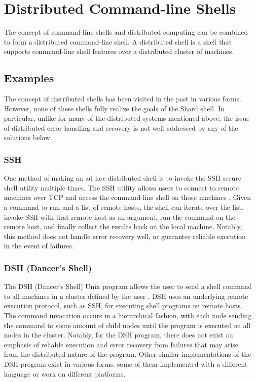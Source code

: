 \documentclass[twoside]{report}
\begin{document}
\section{Distributed Command-line Shells}
The concept of command-line shells and distributed computing can be combined to form a distributed command-line shell.
A distributed shell is a shell that supports command-line shell features over a distributed cluster of machines.

\subsection{Examples}
The concept of distributed shells has been visited in the past in various forms.
However, none of these shells fully realize the goals of the Shard shell.
In particular, unlike for many of the distributed systems mentioned above, the issue of distributed error handling and recovery is not well addressed by any of the solutions below.

\subsubsection{SSH}
One method of making an ad hoc distributed shell is to invoke the SSH secure shell utility multiple times.
The SSH utility allows users to connect to remote machines over TCP and access the command-line shell on those machines \cite{rfc4251}.
Given a command to run and a list of remote hosts, the shell can iterate over the list, invoke SSH with that remote host as an argument, run the command on the remote host, and finally collect the results back on the local machine.
Notably, this method does not handle error recovery well, or guarantee reliable execution in the event of failures.

\subsubsection{DSH (Dancer's Shell)}
The DSH (Dancer's Shell) Unix program allows the user to send a shell command to all machines in a cluster defined by the user \cite{dshdancer}.
DSH uses an underlying remote execution protocol, such as SSH, for executing shell programs on remote hosts.
The command invocation occurs in a hierarchical fashion, with each node sending the command to some amount of child nodes until the program is executed on all nodes in the cluster.
Notably, for the DSH program, there does not exist an emphasis of reliable execution and error recovery from failures that may arise from the distributed nature of the program.
Other similar implementations of the DSH program exist in various forms, some of them implemented with a different language or work on different platforms.
\end{document}

